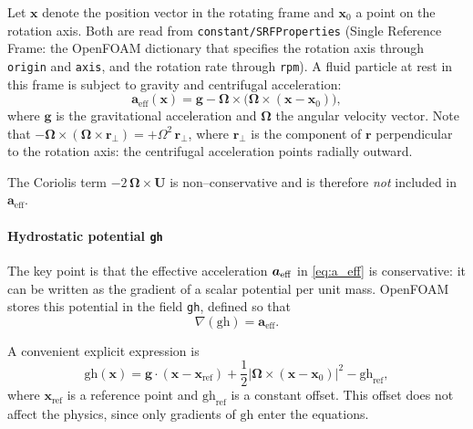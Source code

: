 \documentclass[11pt,a4paper]{article}
\begin{document}
Let \(\boldsymbol{x}\) denote the position vector in the rotating frame
and \(\boldsymbol{x}_0\) a point on the rotation axis. Both are read
from \texttt{constant/SRFProperties} (Single Reference Frame: the
OpenFOAM dictionary that specifies the rotation axis through
\texttt{origin} and \texttt{axis}, and the rotation rate through
\texttt{rpm}). A fluid particle at rest in this frame is
subject to gravity and centrifugal acceleration:
\begin{equation}
	\boldsymbol{a}_{\mathrm{eff}}(\boldsymbol{x})
	=
	\boldsymbol{g}
	-
	\boldsymbol{\Omega}\times
	\bigl(
	\boldsymbol{\Omega}\times(\boldsymbol{x}-\boldsymbol{x}_0)
	\bigr),
	\label{eq:a_eff}
\end{equation}
where \(\boldsymbol{g}\) is the gravitational acceleration and
\(\boldsymbol{\Omega}\) the angular velocity vector.  Note that
\(-\boldsymbol{\Omega}\times(\boldsymbol{\Omega}\times\mathbf{r}_\perp)
= +\Omega^2\,\mathbf{r}_\perp\), where \(\mathbf{r}_\perp\) is the
component of \(\mathbf{r}\) perpendicular to the rotation axis: the
centrifugal acceleration points radially outward.

The Coriolis term \(-2\,\boldsymbol{\Omega}\times\boldsymbol{U}\) is
non–conservative and is therefore \emph{not} included in
\(\boldsymbol{a}_{\mathrm{eff}}\).

\paragraph{Hydrostatic potential \texttt{gh}}

The key point is that the effective acceleration \(\boldsymbol{a}_{\rm eff}\)
in \eqref{eq:a_eff} is conservative: it can be written as the gradient
of a scalar potential per unit mass. OpenFOAM stores this potential in
the field \texttt{gh}, defined so that
\begin{equation}
	\nabla (\mathrm{gh}) = \boldsymbol{a}_{\mathrm{eff}}.
\end{equation}

A convenient explicit expression is
\begin{equation}
	\mathrm{gh}(\boldsymbol{x})
	=
	\boldsymbol{g}\cdot(\boldsymbol{x}-\boldsymbol{x}_{\mathrm{ref}})
	+ \frac{1}{2}
	\left|
	\boldsymbol{\Omega}\times(\boldsymbol{x}-\boldsymbol{x}_0)
	\right|^2
	- \mathrm{gh}_{\mathrm{ref}},
	\label{eq:gh_def}
\end{equation}
where \(\boldsymbol{x}_{\mathrm{ref}}\) is a reference point and
\(\mathrm{gh}_{\mathrm{ref}}\) is a constant offset. This offset does not
affect the physics, since only gradients of \(\mathrm{gh}\) enter the
equations.
\end{document}
